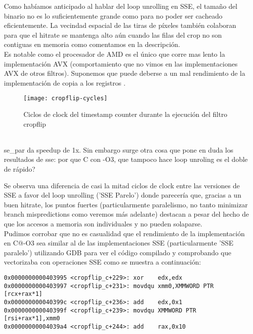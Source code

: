 Como habíamos anticipado al hablar del loop unrolling en SSE, el tamaño del binario no es lo suficientemente grande como para no poder ser cacheado eficientemente. La vecindad espacial de las tiras de píxeles también colaboran para que el hitrate se mantenga alto aún cuando las filas del crop no son contiguas en memoria como comentamos en la descripción.
\\

Es notable como el procesador de AMD es el único que corre mas lento la implementación AVX (comportamiento que no vimos en las implementaciones AVX de otros filtros). Suponemos que puede deberse a un mal rendimiento de la implementación de copia a los registros \ymm{}.

\begin{figure}[H]
\centering
\texttt{[image: cropflip-cycles]}
\label{fig:cropflip-cycles}
\caption{Ciclos de clock del timestamp counter durante la ejecución del filtro cropflip}
\end{figure}

\cuidado \\
se_par da speedup de 1x. Sin embargo surge otra cosa que pone en duda los resultados de sse: por que C con -O3, que tampoco hace loop unroling es el doble de rápido? \\
\cuidado

Se observa una diferencia de casi la mitad ciclos de clock entre las versiones de SSE a favor del loop unrolling ('SSE Parelo') donde parecería que, gracias a un buen hitrate, los puntos fuertes  (particularmente paralelismo, no tanto minimizar branch mispredictions como veremos más adelante) destacan a pesar del hecho de que los accesos a memoria son individuales y no pueden solaparse.
\\

Pudimos corrobar que no es casualidad que el rendimiento de la implementación en C@-O3 sea similar al de las implementaciones SSE (particularmente 'SSE paralelo') utilizando GDB para ver el código compilado y comprobando que vectorizaba con operaciones SSE como se muestra a continuación:

\begin{lstlisting}
0x0000000000403995 <cropflip_c+229>: xor    edx,edx
0x0000000000403997 <cropflip_c+231>: movdqu xmm0,XMMWORD PTR [rcx+rax*1]
0x000000000040399c <cropflip_c+236>: add    edx,0x1
0x000000000040399f <cropflip_c+239>: movdqu XMMWORD PTR [rsi+rax*1],xmm0
0x00000000004039a4 <cropflip_c+244>: add    rax,0x10
\end{lstlisting}


